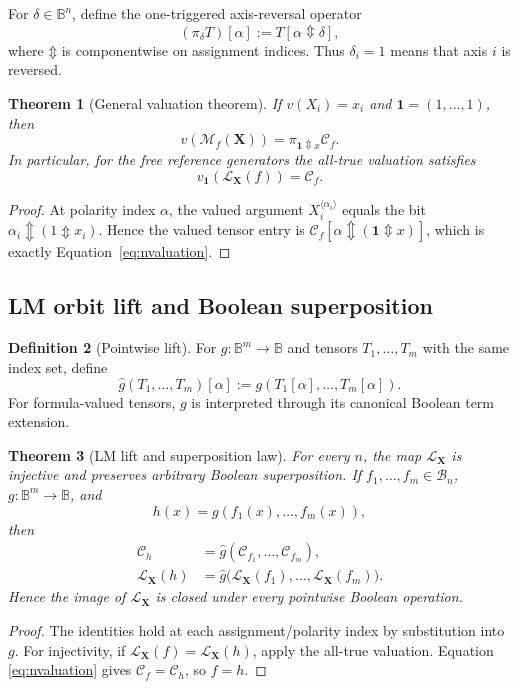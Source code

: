 \documentclass[11pt]{article}
\newtheorem{theorem}{Theorem}[section]
\theoremstyle{definition}
\newtheorem{definition}[theorem]{Definition}
\theoremstyle{remark}
\newcommand{\B}{\mathbb B}
\newcommand{\cC}{\mathcal C}
\newcommand{\cM}{\mathcal M}
\newcommand{\xor}{\mathbin{\Updownarrow}}
\begin{document}
For $\delta\in\B^n$, define the one-triggered axis-reversal operator
\begin{equation}
 (\pi_\delta T)[\alpha]:=T[\alpha\xor\delta],
 \label{eq:piaxis}
\end{equation}
where $\xor$ is componentwise on assignment indices.  Thus $\delta_i=1$ means that axis $i$ is reversed.

\begin{theorem}[General valuation theorem]
If $v(X_i)=x_i$ and $\mathbf1=(1,\ldots,1)$, then
\begin{equation}
 v(\cM_f(\mathbf X))=\pi_{\mathbf1\xor x}\cC_f.
 \label{eq:nvaluation}
\end{equation}
In particular, for the free reference generators the all-true valuation satisfies
\[
 v_{\mathbf1}(\mathcal L_{\mathbf X}(f))=\cC_f.
\]
\end{theorem}
\begin{proof}
At polarity index $\alpha$, the valued argument $X_i^{\langle\alpha_i\rangle}$ equals the bit $\alpha_i\xor(1\xor x_i)$.  Hence the valued tensor entry is $\cC_f[\alpha\xor(\mathbf1\xor x)]$, which is exactly Equation~\eqref{eq:nvaluation}.
\end{proof}

\subsection{LM orbit lift and Boolean superposition}

\begin{definition}[Pointwise lift]
For $g:\B^m\to\B$ and tensors $T_1,\ldots,T_m$ with the same index set, define
\[
 \widehat g(T_1,\ldots,T_m)[\alpha]
 :=g(T_1[\alpha],\ldots,T_m[\alpha]).
\]
For formula-valued tensors, $g$ is interpreted through its canonical Boolean term extension.
\end{definition}

\begin{theorem}[LM lift and superposition law]
For every $n$, the map $\mathcal L_{\mathbf X}$ is injective and preserves arbitrary Boolean superposition.  If $f_1,\ldots,f_m\in\mathcal B_n$, $g:\B^m\to\B$, and
\[
 h(x)=g(f_1(x),\ldots,f_m(x)),
\]
then
\begin{align}
 \cC_h&=\widehat g(\cC_{f_1},\ldots,\cC_{f_m}),
 \label{eq:numericclosure}\\
 \mathcal L_{\mathbf X}(h)
 &=\widehat g\bigl(\mathcal L_{\mathbf X}(f_1),\ldots,
                    \mathcal L_{\mathbf X}(f_m)\bigr).
 \label{eq:symbolicclosure}
\end{align}
Hence the image of $\mathcal L_{\mathbf X}$ is closed under every pointwise Boolean operation.
\end{theorem}
\begin{proof}
The identities hold at each assignment/polarity index by substitution into $g$.  For injectivity, if $\mathcal L_{\mathbf X}(f)=\mathcal L_{\mathbf X}(h)$, apply the all-true valuation.  Equation \eqref{eq:nvaluation} gives $\cC_f=\cC_h$, so $f=h$.
\end{proof}
\end{document}
